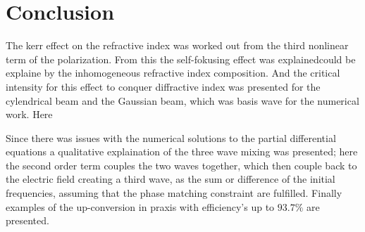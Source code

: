 \chapter{Conclusion}
\label{cha:conclusion}


The kerr effect on the refractive index was worked out from the third nonlinear term of the polarization.
From this the self-fokusing effect was explainedcould be explaine by the inhomogeneous refractive index composition.
And the critical intensity for this effect to conquer diffractive index was presented for the cylendrical beam and the Gaussian beam, which was basis wave for the numerical work. 
Here 


Since there was issues with the numerical solutions to the partial differential equations a qualitative explaination of the three wave mixing was presented; here the second order term couples the two waves together, which then couple back to the electric field creating a third wave, as the sum or difference of the initial frequencies, assuming that the phase matching constraint are fulfilled. Finally examples of the up-conversion in praxis with efficiency's up to $93.7\%$ are presented.


